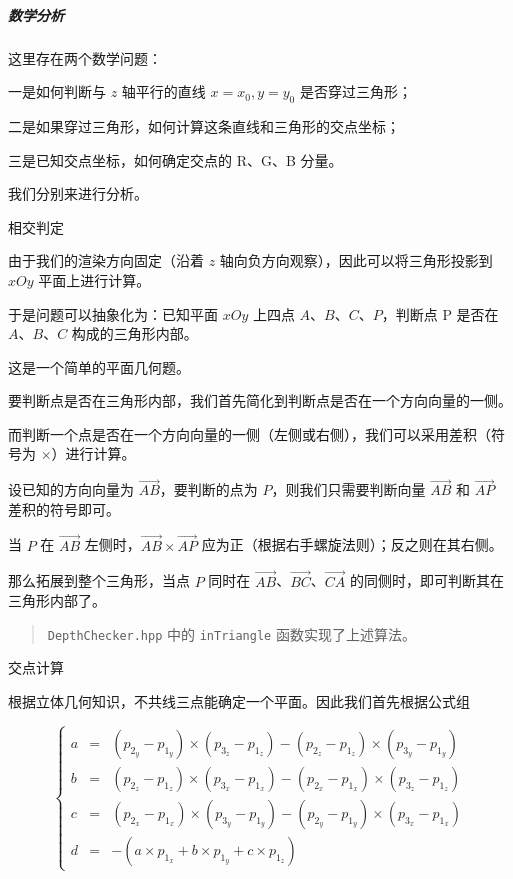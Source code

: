 \documentclass[
]{article}
\begin{document}
\hypertarget{header-n102}{%
\subparagraph{数学分析}\label{header-n102}}

这里存在两个数学问题：

一是如何判断与 \(z\) 轴平行的直线 \(x = x_0, y = y_0\) 是否穿过三角形；

二是如果穿过三角形，如何计算这条直线和三角形的交点坐标；

三是已知交点坐标，如何确定交点的 R、G、B 分量。

我们分别来进行分析。

相交判定

由于我们的渲染方向固定（沿着 \(z\)
轴向负方向观察），因此可以将三角形投影到 \(xOy\) 平面上进行计算。

于是问题可以抽象化为：已知平面 \(xOy\) 上四点
\(A\)、\(B\)、\(C\)、\(P\)，判断点 P 是否在 \(A\)、\(B\)、\(C\)
构成的三角形内部。

这是一个简单的平面几何题。

要判断点是否在三角形内部，我们首先简化到判断点是否在一个方向向量的一侧。

而判断一个点是否在一个方向向量的一侧（左侧或右侧），我们可以采用差积（符号为
\(\times\)）进行计算。

设已知的方向向量为 \(\overrightarrow{AB}\)，要判断的点为
\(P\)，则我们只需要判断向量 \(\overrightarrow{AB}\) 和
\(\overrightarrow{AP}\) 差积的符号即可。

当 \(P\) 在 \(\overrightarrow{AB}\)
左侧时，\(\overrightarrow{AB} \times \overrightarrow{AP}\)
应为正（根据右手螺旋法则）；反之则在其右侧。

那么拓展到整个三角形，当点 \(P\) 同时在
\(\overrightarrow{AB}\)、\(\overrightarrow{BC}\)、\(\overrightarrow{CA}\)
的同侧时，即可判断其在三角形内部了。

\begin{quote}
\texttt{DepthChecker.hpp} 中的 \texttt{inTriangle} 函数实现了上述算法。
\end{quote}

交点计算

根据立体几何知识，不共线三点能确定一个平面。因此我们首先根据公式组

\[\left\{
\begin{aligned}
a & = & (p_{2_y} - p_{1_y}) \times (p_{3_z} - p_{1_z}) - (p_{2_z} - p_{1_z}) \times (p_{3_y} - p_{1_y}) \\
b & = & (p_{2_z} - p_{1_z}) \times (p_{3_x} - p_{1_x}) - (p_{2_x} - p_{1_x}) \times (p_{3_z} - p_{1_z}) \\
c & = & (p_{2_x} - p_{1_x}) \times (p_{3_y} - p_{1_y}) - (p_{2_y} - p_{1_y}) \times (p_{3_x} - p_{1_x}) \\
d & = &  - (a \times p_{1_x} + b \times p_{1_y} + c \times p_{1_z})
\end{aligned}
\right.\]
\end{document}
